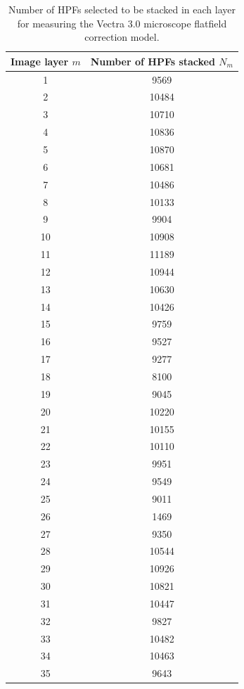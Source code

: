 \documentclass[letterpaper,11pt]{article}
\begin{document}
\begin{table}[!htb]
\centering
\begin{tabular}{c c}
Image layer $m$ & Number of HPFs stacked $N_{m}$ \\
\hline
1               & 9569 \\
2               & 10484 \\
3               & 10710 \\
4               & 10836 \\
5               & 10870 \\
6               & 10681 \\
7               & 10486 \\
8               & 10133 \\
9               & 9904 \\
10              & 10908 \\
11              & 11189 \\
12              & 10944 \\
13              & 10630 \\
14              & 10426 \\
15              & 9759 \\
16              & 9527 \\
17              & 9277 \\
18              & 8100 \\
19              & 9045 \\
20              & 10220 \\
21              & 10155 \\
22              & 10110 \\
23              & 9951 \\
24              & 9549 \\
25              & 9011 \\
26              & 1469 \\
27              & 9350 \\
28              & 10544 \\
29              & 10926 \\
30              & 10821 \\
31              & 10447 \\
32              & 9827 \\
33              & 10482 \\
34              & 10463 \\
35              & 9643 \\
\hline
\end{tabular}
\caption{\footnotesize Number of HPFs selected to be stacked in each layer for measuring the Vectra 3.0 microscope flatfield correction model.}
\label{tab:n_images_stacked_by_layer_vectra}
\end{table}
\end{document}
